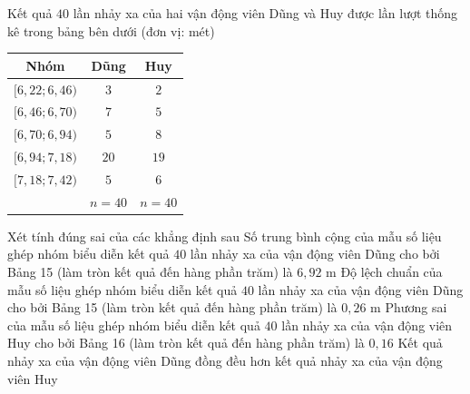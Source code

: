 \begin{ex}%
	Kết quả $ 40$  lần nhảy xa của hai vận động viên Dũng và Huy được lần lượt thống kê trong bảng bên dưới (đơn vị: mét)
	\begin{longtable}{|c|c|c|}
		\hline 
		Nhóm & Dũng  & Huy\\
		 \hline
		$[6{,}22;6{,}46)$ &  $3$ & $2$\\
		\hline 
		$[6{,}46;6{,}70)$ & $7$  & $5$\\
		 \hline
		$[6{,}70;6{,}94)$  & $5$ & $8$\\
		\hline 
		$[6{,}94;7{,}18)$ & $20$ &  $19$\\
		\hline 
		$[7{,}18;7{,}42)$ & $5$ & $6$\\ 
		\hline 
		& $n=40$ &  $n=40$\\
		\hline 
	\end{longtable}
	Xét tính đúng  sai của các khẳng định sau
	 \choiceTF
		{\True Số trung bình cộng của mẫu số  liệu ghép nhóm biểu diễn kết quả $40$ lần nhảy xa của vận động viên Dũng cho bởi Bảng 15 (làm tròn kết quả đến hàng phần trăm) là $ 6{,}92$ m}
		{\True Độ lệch chuẩn của mẫu số liệu ghép  nhóm biểu diễn kết quả $40$ lần nhảy xa của vận động viên Dũng cho bởi Bảng 15 (làm tròn kết quả đến hàng phần trăm) là $ 0{,}26$ m}
		{Phương sai của mẫu số liệu ghép nhóm biểu diễn kết quả $40$ lần nhảy xa của vận động viên Huy cho bởi Bảng 16 (làm  tròn kết quả đến hàng phần trăm) là $ 0{,}16$}
		{Kết quả nhảy xa của vận động viên Dũng  đồng đều hơn kết quả nhảy xa của vận động viên Huy}
\end{ex}
